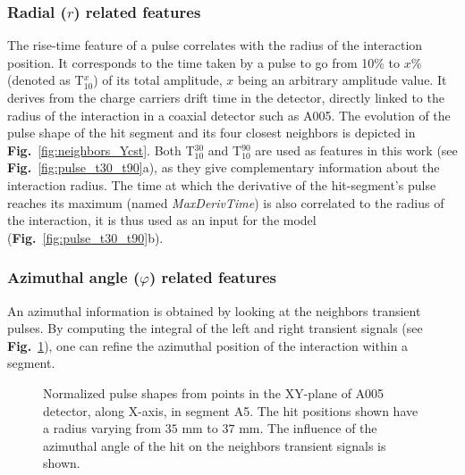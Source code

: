 \subsubsection{Radial ($r$) related features}
The rise-time feature of a pulse correlates with the radius of the interaction position. It corresponds to the time taken by a pulse to go from 10\% to $x$\% (denoted as T$^{x}_{10}$) of its total amplitude, $x$ being an arbitrary amplitude value. It derives from the charge carriers drift time in the detector, directly linked to the radius of the interaction in a coaxial detector such as A005. The evolution of the pulse shape of the hit segment and its four closest neighbors is depicted in \textbf{Fig.}~\ref{fig:neighbors_Ycst}. Both T$^{30}_{10}$ and T$^{90}_{10}$ are used as features in this work (see \textbf{Fig.}~\ref{fig:pulse_t30_t90}a), as they give complementary information about the interaction radius.
The time at which the derivative of the hit-segment's pulse reaches its maximum (named \textit{MaxDerivTime}) is also correlated to the radius of the interaction, it is thus used as an input for the model (\textbf{Fig.}~\ref{fig:pulse_t30_t90}b).

\subsubsection{Azimuthal angle ($\varphi$) related features}
An azimuthal information is obtained by looking at the neighbors transient pulses. By computing the integral of the left and right transient signals (see \textbf{Fig.}~\ref{fig:neighbor_signals_RadCst}), one can refine the azimuthal position of the interaction within a segment.

\begin{figure}
\centering
{}
\caption{Normalized pulse shapes from points in the XY-plane
of A005 detector, along X-axis, in segment A5. The hit positions shown have a radius varying from $35$ mm to $37$ mm. The influence of the azimuthal angle of the hit on the neighbors transient signals is shown.}
\label{fig:neighbor_signals_RadCst}
\end{figure}

